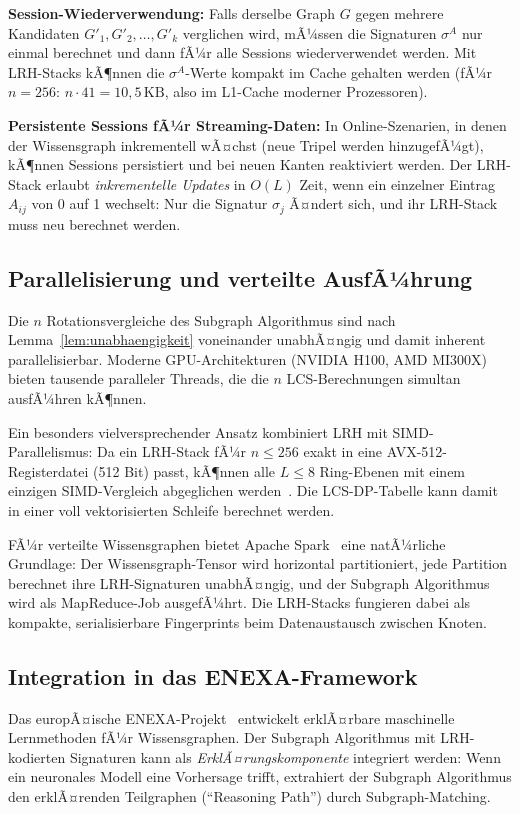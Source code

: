 ﻿\documentclass[a4paper,12pt]{article}
\theoremstyle{definition}
\begin{document}
\textbf{Session-Wiederverwendung:} Falls derselbe Graph $G$ gegen mehrere Kandidaten
$G'_1, G'_2, \ldots, G'_k$ verglichen wird, mÃ¼ssen die Signaturen $\sigma^A$ nur
einmal berechnet und dann fÃ¼r alle Sessions wiederverwendet werden. Mit LRH-Stacks
kÃ¶nnen die $\sigma^A$-Werte kompakt im Cache gehalten werden (fÃ¼r $n=256$:
$n \cdot 41 = 10{,}5\,\text{KB}$, also im L1-Cache moderner Prozessoren).

\textbf{Persistente Sessions fÃ¼r Streaming-Daten:} In Online-Szenarien, in denen der
Wissensgraph inkrementell wÃ¤chst (neue Tripel werden hinzugefÃ¼gt), kÃ¶nnen Sessions
persistiert und bei neuen Kanten reaktiviert werden. Der LRH-Stack erlaubt
\emph{inkrementelle Updates} in $O(L)$ Zeit, wenn ein einzelner Eintrag $A_{ij}$
von 0 auf 1 wechselt: Nur die Signatur $\sigma_j$ Ã¤ndert sich, und ihr LRH-Stack
muss neu berechnet werden.

\subsection{Parallelisierung und verteilte AusfÃ¼hrung}

Die $n$ Rotationsvergleiche des Subgraph Algorithmus sind nach
Lemma~\ref{lem:unabhaengigkeit} voneinander unabhÃ¤ngig und damit inherent
parallelisierbar. Moderne GPU-Architekturen (NVIDIA H100, AMD MI300X) bieten
tausende paralleler Threads, die die $n$ LCS-Berechnungen simultan ausfÃ¼hren kÃ¶nnen.

Ein besonders vielversprechender Ansatz kombiniert LRH mit SIMD-Parallelismus:
Da ein LRH-Stack fÃ¼r $n \leq 256$ exakt in eine AVX-512-Registerdatei (512 Bit)
passt, kÃ¶nnen alle $L \leq 8$ Ring-Ebenen mit einem einzigen SIMD-Vergleich
abgeglichen werden~\cite{nvidia2022}. Die LCS-DP-Tabelle kann damit in einer
voll vektorisierten Schleife berechnet werden.

FÃ¼r verteilte Wissensgraphen bietet Apache Spark~\cite{zaharia2016} eine natÃ¼rliche
Grundlage: Der Wissensgraph-Tensor wird horizontal partitioniert, jede Partition
berechnet ihre LRH-Signaturen unabhÃ¤ngig, und der Subgraph Algorithmus wird als
MapReduce-Job ausgefÃ¼hrt. Die LRH-Stacks fungieren dabei als kompakte, serialisierbare
Fingerprints beim Datenaustausch zwischen Knoten.

\subsection{Integration in das ENEXA-Framework}

Das europÃ¤ische ENEXA-Projekt~\cite{enexa2023} entwickelt erklÃ¤rbare
maschinelle Lernmethoden fÃ¼r Wissensgraphen. Der Subgraph Algorithmus mit
LRH-kodierten Signaturen kann als \emph{ErklÃ¤rungskomponente} integriert werden:
Wenn ein neuronales Modell eine Vorhersage trifft, extrahiert der Subgraph Algorithmus
den erklÃ¤renden Teilgraphen (``Reasoning Path'') durch Subgraph-Matching.
\end{document}
